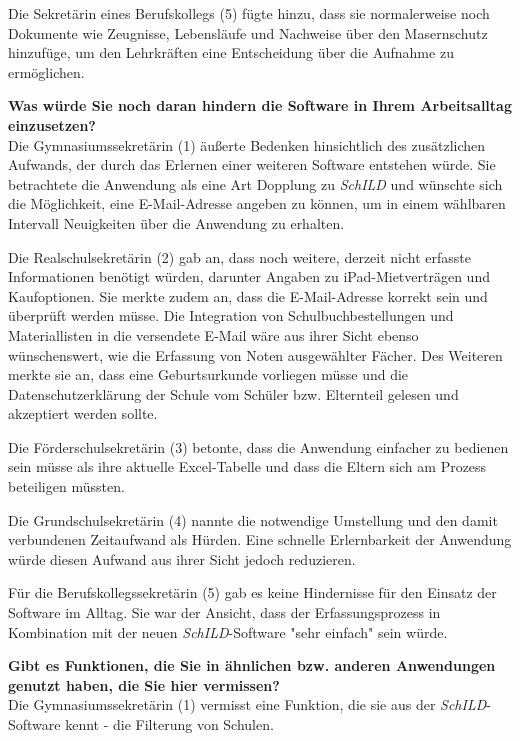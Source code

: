 Die Sekretärin eines Berufskollegs (5) fügte hinzu, dass sie normalerweise noch Dokumente wie Zeugnisse, Lebensläufe und Nachweise über den Masernschutz hinzufüge, um den Lehrkräften eine Entscheidung über die Aufnahme zu ermöglichen.

\textbf{Was würde Sie noch daran hindern die Software in Ihrem Arbeitsalltag einzusetzen?}\\
Die Gymnasiumssekretärin (1) äußerte Bedenken hinsichtlich des zusätzlichen Aufwands, der durch das Erlernen einer weiteren Software entstehen würde. Sie betrachtete die Anwendung als eine Art Dopplung zu \textit{SchILD} und wünschte sich die Möglichkeit, eine E-Mail-Adresse angeben zu können, um in einem wählbaren Intervall Neuigkeiten über die Anwendung zu erhalten.

Die Realschulsekretärin (2) gab an, dass noch weitere, derzeit nicht erfasste Informationen benötigt würden, darunter Angaben zu iPad-Mietverträgen und Kaufoptionen. Sie merkte zudem an, dass die E-Mail-Adresse korrekt sein und überprüft werden müsse. Die Integration von Schulbuchbestellungen und Materiallisten in die versendete E-Mail wäre aus ihrer Sicht ebenso wünschenswert, wie die Erfassung von Noten ausgewählter Fächer. Des Weiteren merkte sie an, dass eine Geburtsurkunde vorliegen müsse und die Datenschutzerklärung der Schule vom Schüler bzw. Elternteil gelesen und akzeptiert werden sollte.

Die Förderschulsekretärin (3) betonte, dass die Anwendung einfacher zu bedienen sein müsse als ihre aktuelle Excel-Tabelle und dass die Eltern sich am Prozess beteiligen müssten.

Die Grundschulsekretärin (4) nannte die notwendige Umstellung und den damit verbundenen Zeitaufwand als Hürden. Eine schnelle Erlernbarkeit der Anwendung würde diesen Aufwand aus ihrer Sicht jedoch reduzieren.

Für die Berufskollegssekretärin (5) gab es keine Hindernisse für den Einsatz der Software im Alltag. Sie war der Ansicht, dass der Erfassungsprozess in Kombination mit der neuen \textit{SchILD}-Software "sehr einfach" sein würde.


\textbf{Gibt es Funktionen, die Sie in ähnlichen bzw. anderen Anwendungen genutzt haben, die Sie hier vermissen?}\\
Die Gymnasiumssekretärin (1) vermisst eine Funktion, die sie aus der \textit{SchILD}-Software kennt - die Filterung von Schulen.

